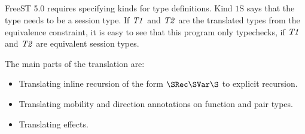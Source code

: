 {
  \setlength{\blanklineskip}{\medskipamount}
  \TightCode[\bigskipamount]
\begin{hscode}\SaveRestoreHook\linenoSetup\linenoStart
{}%
%
%
%
\>[B]{}\qquad {}\<[BE]%
\>[7]{}\;\mathbin{:}\<[E]%
\\
\linenoStart \>[7]{}\;\mathrel{=}\mathord{!}\mathop{;}\mathord{!}\mathop{;}\<[E]%
\\[\blanklineskip]%
\linenoStart \>[7]{}\;\mathbin{:}\<[E]%
\\
\linenoStart \>[7]{}\;\mathrel{=}\<[E]%
\\[\blanklineskip]%
\linenoStart \>[7]{}\;\mathbin{:}\<[E]%
\\
\linenoStart \>[7]{}\;\mathrel{=}\mathop{;}\mathord{!}\mathop{;}\mathord{!}\mathop{;}\<[E]%
\\[\blanklineskip]%
\linenoStart \>[7]{}\;\mathbin{:}\<[E]%
\\
\linenoStart \>[7]{}\;\mathrel{=}\<[E]%
\\[\blanklineskip]%
\linenoStart \>[7]{}\mathbin{:}\to {}\<[E]%
\\
\linenoStart \>[7]{}\;\mathrel{=}\<[E]%
\ColumnHook
\end{hscode}\resethooks
}

\noindent FreeST 5.0 requires specifying kinds for type definitions.
Kind \ensuremath{\mathrm{1S}} says that the type needs to be a session type.
If \ensuremath{\Conid{T1}} and \ensuremath{\Conid{T2}} are the translated types from the equivalence constraint,
it is easy to see that this program only typechecks, if \ensuremath{\Conid{T1}} and
\ensuremath{\Conid{T2}} are equivalent session types.

The main parts of the translation are:
\begin{itemize}
  \item Translating inline recursion of the form $\SRec\SVar\S$ to explicit recursion.
  \item Translating mobility and direction annotations on function and pair
    types.
  \item Translating effects.
\end{itemize}

